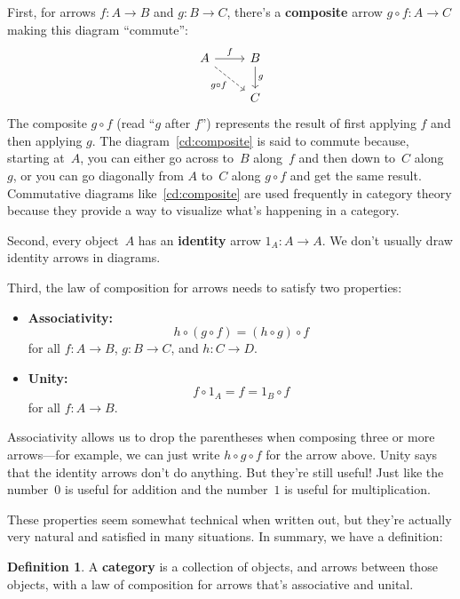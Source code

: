 \documentclass[letterpaper,12pt]{article}
\newcommand{\after}{\circ}
\newcommand{\textdefn}{\textbf}
\theoremstyle{definition}
\newtheorem{defn}[equation]{Definition}
\theoremstyle{plain}
\numberwithin{equation}{section}
\begin{document}
First, for arrows \(f:A\to B\) and \(g:B\to C\), there's a \textdefn{composite} arrow \(g\after f:A\to C\) making this diagram ``commute'':
\begin{equation}
\begin{tikzcd}
A \ar[rd,dashed, "g\after f"'] \ar[r,"f"] & B \ar[d,"g"] \\
  & C
\end{tikzcd}
\label{cd:composite}
\end{equation}
The composite \(g\after f\) (read ``\(g\) after \(f\)'') represents the result of first applying \(f\) and then applying \(g\). The diagram~\eqref{cd:composite} is said to commute because, starting at~\(A\), you can either go across to~\(B\) along~\(f\) and then down to~\(C\) along~\(g\), or you can go diagonally from \(A\) to~\(C\) along \(g\after f\) and get the same result. Commutative diagrams like~\eqref{cd:composite} are used frequently in category theory because they provide a way to visualize what's happening in a category.

Second, every object~\(A\) has an \textdefn{identity} arrow \(1_A:A\to A\). We don't usually draw identity arrows in diagrams.

Third, the law of composition for arrows needs to satisfy two properties:
\begin{itemize}
\item \textdefn{Associativity:}
\[h\after(g\after f)=(h\after g)\after f\]
for all \(f:A\to B\), \(g:B\to C\), and \(h:C\to D\).
\item \textdefn{Unity:}
\[f\after 1_A=f=1_B\after f\]
for all \(f:A\to B\).
\end{itemize}
Associativity allows us to drop the parentheses when composing three or more arrows---for example, we can just write \(h\after g\after f\) for the arrow above. Unity says that the identity arrows don't do anything. But they're still useful! Just like the number~\(0\) is useful for addition and the number~\(1\) is useful for multiplication.

These properties seem somewhat technical when written out, but they're actually very natural and satisfied in many situations. In summary, we have a definition:
\begin{defn}
A \textdefn{category} is a collection of objects, and arrows between those objects, with a law of composition for arrows that's associative and unital.
\end{defn}
\end{document}
